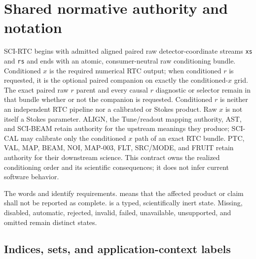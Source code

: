 \hypertarget{rtc-core-begin}{}
\section{Shared normative authority and notation}
\label{sec:core-notation}

\begin{center}
\end{center}

SCI-RTC begins with admitted aligned paired raw detector-coordinate streams
\texttt{xs} and \texttt{rs} and ends with an atomic, consumer-neutral raw
conditioning bundle.  Conditioned $x$ is the required numerical RTC output;
when conditioned $r$ is requested, it is the optional paired companion on
exactly the conditioned-$x$ grid.  The exact paired raw $r$ parent and every
causal $r$ diagnostic or selector remain in that bundle whether or not the
companion is requested.  Conditioned $r$ is neither an independent RTC
pipeline nor a calibrated or Stokes product.  Raw $x$ is not itself a Stokes
parameter.  ALIGN, the Tune/readout mapping authority, AST, and
SCI-BEAM retain authority for the upstream meanings they produce; SCI-CAL may
calibrate only the conditioned $x$ path of an exact RTC bundle.  PTC, VAL,
MAP, BEAM, NOI, MAP-003, FLT, SRC/MODE, and FRUIT retain authority for their
downstream science.  This contract owns the realized conditioning order and
its scientific consequences; it does not infer current software behavior.

The words  and  identify requirements.
 means that the affected product or claim shall
not be reported as complete.   is a typed,
scientifically inert state.  Missing, disabled, automatic, rejected, invalid,
failed, unavailable, unsupported, and omitted remain distinct states.

\subsection{Indices, sets, and application-context labels}

